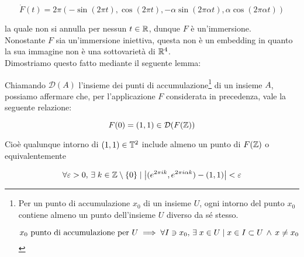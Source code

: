 \begin{equation}
	\dot{F}(t) = 2 \pi (- \sin(2 \pi t), \cos(2 \pi t), - \alpha \sin(2 \pi \alpha t), \alpha \cos(2 \pi \alpha t))
\end{equation}

la quale non si annulla per nessun $ t \in \mathbb{R} $, dunque $ F $ è un'immersione.\\
Nonostante $ F $ sia un'immersione iniettiva, questa non è un embedding in quanto la sua immagine non è una sottovarietà di $ \mathbb{R}^{4} $.\\
Dimostriamo questo fatto mediante il seguente lemma:

\begin{lemma}
	Chiamando $ \mathcal{D}(A) $ l'insieme dei punti di accumulazione\footnote{%
		Per un punto di accumulazione $ x_{0} $ di un insieme $ U $, ogni intorno del punto $ x_{0} $ contiene almeno un punto dell'insieme $ U $ diverso da sé stesso.
		
		\begin{equation}
			x_{0} \text{ punto di accumulazione per } U %
			\implies %
			\forall I \ni x_{0}, \, \E x \in U \mid x \in I \subset U \, \wedge \, x \neq x_{0}
		\end{equation} %
	} di un insieme $ A $, possiamo affermare che, per l'applicazione $ F $ considerata in precedenza, vale la seguente relazione:
	
	\begin{equation}
		F(0) = (1,1) \in \mathcal{D}(F(\mathbb{Z}))
	\end{equation}

	Cioè qualunque intorno di $ (1,1) \in \mathbb{T}^{2} $ include almeno un punto di $ F(\mathbb{Z}) $ o equivalentemente
	
	\begin{equation}
		\forall \varepsilon > 0, \, \exists \; k \in \mathbb{Z} \setminus \{0\} \mid \left| (e^{2 \pi i k}, e^{2 \pi i \alpha k}) - (1,1) \right| < \varepsilon
	\end{equation}
\end{lemma}

